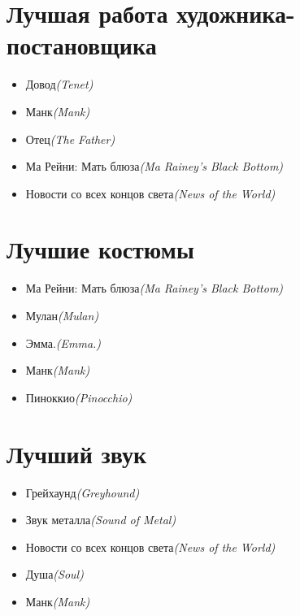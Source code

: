 \documentclass[a4paper,10pt]{article}
\begin{document}
\begin{multicols}{2}
\section{Лучшая работа художника-постановщика}

\begin{itemize}
	\item Довод\newline\textit{(Tenet)}
	\item Манк\newline\textit{(Mank)}
	\item Отец\newline\textit{(The Father)}
	\item Ма Рейни: Мать блюза\newline\textit{(Ma Rainey's Black Bottom)}
	\item Новости со всех концов света\newline\textit{(News of the World)}
\end{itemize}

\section{Лучшие костюмы}

\begin{itemize}
	\item Ма Рейни: Мать блюза\newline\textit{(Ma Rainey's Black Bottom)}
	\item Мулан\newline\textit{(Mulan)}
	\item Эмма.\newline\textit{(Emma.)}
	\item Манк\newline\textit{(Mank)}
	\item Пиноккио\newline\textit{(Pinocchio)}
\end{itemize}

\section{Лучший звук}

\begin{itemize}
	\item Грейхаунд\newline\textit{(Greyhound)}
	\item Звук металла\newline\textit{(Sound of Metal)}
	\item Новости со всех концов света\newline\textit{(News of the World)}
	\item Душа\newline\textit{(Soul)}
	\item Манк\newline\textit{(Mank)}
\end{itemize}


\end{multicols}
\end{document}
